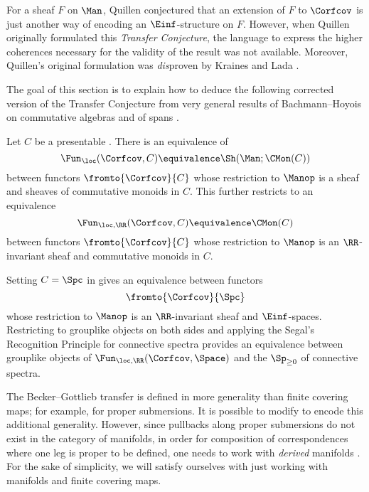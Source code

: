 For a sheaf $ F $ on $ \Man $, Quillen conjectured that an extension of $ F $ to $ \Corfcov $ is just another way of encoding an $ \Einf $-structure on $ F $.
However, when Quillen originally formulated this \textit{Transfer Conjecture}, the language to express the higher coherences necessary for the validity of the result was not available.
Moreover, Quillen's original formulation was \textit{dis}proven by Kraines and Lada \cites{MR557187}{MR3243401}.

The goal of this section is to explain how to deduce the following corrected version of the Transfer Conjecture from very general results of Bachmann--Hoyois on commutative algebras and \categories of spans \cite[Appendix C]{MotivicNorms:BachmannHoyois}.

\begin{theorem}\label{thm:transfer}
	Let $ C $ be a presentable \category.
	There is an equivalence of \categories
	\begin{equation*}
		\Fun_{\loc}(\Corfcov,C) \equivalence \Sh(\Man;\CMon(C))
	\end{equation*}
	between functors $ \fromto{\Corfcov}{C} $ whose restriction to $ \Manop $ is a sheaf and sheaves of commutative monoids in $ C $.
	This further restricts to an equivalence
	\begin{equation*}
		\Fun_{\loc,\RR}(\Corfcov,C) \equivalence \CMon(C)
	\end{equation*}
	between functors $ \fromto{\Corfcov}{C} $ whose restriction to $ \Manop $ is an $ \RR $-invariant sheaf and commutative monoids in $ C $.
\end{theorem}

\begin{example}
	Setting $ C = \Spc $ in  gives an equivalence between functors
	\begin{equation*}
		\fromto{\Corfcov}{\Spc}
	\end{equation*}
	whose restriction to $ \Manop $ is an $ \RR $-invariant sheaf and $ \Einf $-spaces.
	Restricting to grouplike objects on both sides and applying the Segal's Recognition Principle for connective spectra  provides an equivalence between grouplike objects of $ \Fun_{\loc,\RR}(\Corfcov,\Space) $ and the \category $ \Sp_{\geq 0} $ of connective spectra. 
\end{example}

\begin{remark}
	The Becker--Gottlieb transfer is defined in more generality than finite covering maps; for example, for proper submersions.
	It is possible to modify  to encode this additional generality.
	However, since pullbacks along proper submersions do not exist in the category of manifolds, in order for composition of correspondences where one leg is proper to be defined, one needs to work with \textit{derived} manifolds \cites{arXiv:1905.06195}{MR2641940}.
	For the sake of simplicity, we will satisfy ourselves with just working with manifolds and finite covering maps.
\end{remark}

